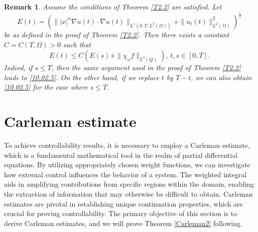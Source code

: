 \documentclass[11pt]{article}
\numberwithin{equation}{section}
\newtheorem{remark}{Remark}[section]
\def\Om{\Omega}
\def\al{\alpha}
\def\f{\frac}
\begin{document}
		\begin{remark}\label{R1}
			Assume the conditions of Theorem \ref{T2.2} are satisfied. Let
			\begin{equation*}
				E(t)=\left(\||x|^\al \nabla u(t)\cdot \nabla u(t)\|_{L^1(0,T; L^2(\Om))}+\|u_t(t)\|_{L^2(\Om)}^2\right)^\f{1}{2}
			\end{equation*}
			be as defined in the proof of Theorem \ref{T2.2}. Then there exists a constant $C=C(T, \Om)>0$ such that
			\begin{equation}\label{10.02.5}
				E(t)\leq C\left(E(s)+\|\chi_\omega f\|_{L^2(Q)}\right), \ t,s\in [0,T].
			\end{equation}
			Indeed, if  $s\leq T$, then the same argument used in the proof of Theorem \ref{T2.2} leads to \eqref{10.02.5}. On the other hand, if we replace
			$t$ by $T-t$, we can also obtain \eqref{10.02.5} for the case where $s\leq T$.
			
		\end{remark}
		
		
		\section{Carleman estimate}\label{Se4}
		To achieve controllability results, it is necessary to employ a Carleman estimate, which is a fundamental mathematical tool in the realm of partial differential equations. By utilizing appropriately chosen weight functions, we can investigate how external control influences the behavior of a system. The weighted integral aids in amplifying contributions from specific regions within the domain, enabling the extraction of information that may otherwise be difficult to obtain. Carleman estimates are pivotal in establishing unique continuation properties, which are crucial for proving controllability. The primary objective of this section is to derive Carleman estimates, and we will prove Theorem \ref{Carleman2} following.
		
\end{document}
